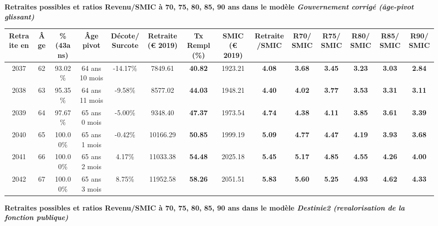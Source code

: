  \vspace{0.1cm} 
{\bf \noindent Retraites possibles et ratios Revenu/SMIC à 70, 75, 80, 85, 90 ans dans le modèle \emph{Gouvernement corrigé (âge-pivot glissant)}}  
 
\begin{adjustbox}{max width=\textwidth} 
\begin{tabular}[htb]{|c|c||c|c|c||c|c||c|c||c|c|c|c|c|} 
\hline 
 Retraite en &  Âge &  \%(43ans) &  Âge pivot &  Décote/Surcote &  Retraite (\euro{} 2019) &  Tx Rempl(\%) &  SMIC (\euro{} 2019) &  Retraite/SMIC &  R70/SMIC &  R75/SMIC &  R80/SMIC &  R85/SMIC &  R90/SMIC \\ 
\hline \hline 
 2037 &  62 &  93.02\% &  64 ans 10 mois &  -14.17\% &  7849.61 &  {\bf 40.82} &  1923.21 &  {\bf 4.08} &  {\bf 3.68} &  {\bf 3.45} &  {\bf 3.23} &  {\bf 3.03} &  {\bf 2.84} \\ 
\hline 
 2038 &  63 &  95.35\% &  64 ans 11 mois &  -9.58\% &  8577.02 &  {\bf 44.03} &  1948.21 &  {\bf 4.40} &  {\bf 4.02} &  {\bf 3.77} &  {\bf 3.53} &  {\bf 3.31} &  {\bf 3.11} \\ 
\hline 
 2039 &  64 &  97.67\% &  65 ans 0 mois &  -5.00\% &  9348.40 &  {\bf 47.37} &  1973.54 &  {\bf 4.74} &  {\bf 4.38} &  {\bf 4.11} &  {\bf 3.85} &  {\bf 3.61} &  {\bf 3.39} \\ 
\hline 
 2040 &  65 &  100.00\% &  65 ans 1 mois &  -0.42\% &  10166.29 &  {\bf 50.85} &  1999.19 &  {\bf 5.09} &  {\bf 4.77} &  {\bf 4.47} &  {\bf 4.19} &  {\bf 3.93} &  {\bf 3.68} \\ 
\hline 
 2041 &  66 &  100.00\% &  65 ans 2 mois &  4.17\% &  11033.38 &  {\bf 54.48} &  2025.18 &  {\bf 5.45} &  {\bf 5.17} &  {\bf 4.85} &  {\bf 4.55} &  {\bf 4.26} &  {\bf 4.00} \\ 
\hline 
 2042 &  67 &  100.00\% &  65 ans 3 mois &  8.75\% &  11952.58 &  {\bf 58.26} &  2051.51 &  {\bf 5.83} &  {\bf 5.60} &  {\bf 5.25} &  {\bf 4.93} &  {\bf 4.62} &  {\bf 4.33} \\ 
\hline 
\hline 
\end{tabular} 
\end{adjustbox} 
 
 \vspace{0.1cm} 
{\bf \noindent Retraites possibles et ratios Revenu/SMIC à 70, 75, 80, 85, 90 ans dans le modèle \emph{Destinie2 (revalorisation de la fonction publique)}}  
 
